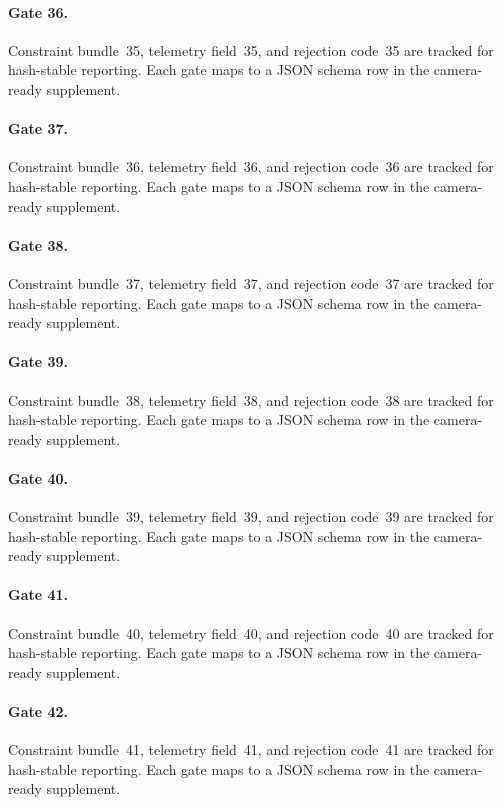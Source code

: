 \documentclass[sigconf,nonacm]{acmart}
\begin{document}
\paragraph{Gate 36.}
Constraint bundle~35, telemetry field~35, and rejection code~35 are tracked for hash-stable reporting. Each gate maps to a JSON schema row in the camera-ready supplement. %

\paragraph{Gate 37.}
Constraint bundle~36, telemetry field~36, and rejection code~36 are tracked for hash-stable reporting. Each gate maps to a JSON schema row in the camera-ready supplement. %

\paragraph{Gate 38.}
Constraint bundle~37, telemetry field~37, and rejection code~37 are tracked for hash-stable reporting. Each gate maps to a JSON schema row in the camera-ready supplement. %

\paragraph{Gate 39.}
Constraint bundle~38, telemetry field~38, and rejection code~38 are tracked for hash-stable reporting. Each gate maps to a JSON schema row in the camera-ready supplement. %

\paragraph{Gate 40.}
Constraint bundle~39, telemetry field~39, and rejection code~39 are tracked for hash-stable reporting. Each gate maps to a JSON schema row in the camera-ready supplement. %

\paragraph{Gate 41.}
Constraint bundle~40, telemetry field~40, and rejection code~40 are tracked for hash-stable reporting. Each gate maps to a JSON schema row in the camera-ready supplement. %

\paragraph{Gate 42.}
Constraint bundle~41, telemetry field~41, and rejection code~41 are tracked for hash-stable reporting. Each gate maps to a JSON schema row in the camera-ready supplement. %
\end{document}
